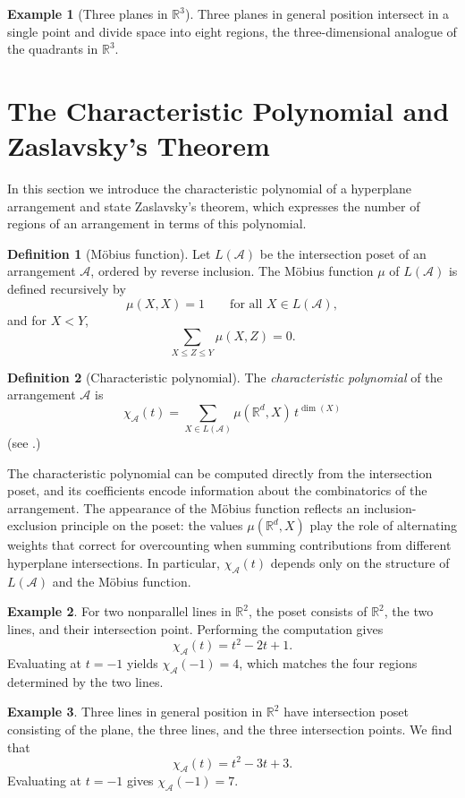 \documentclass[12pt]{amsart}
\theoremstyle{plain}
\theoremstyle{definition}
\newtheorem{definition}{Definition}[section]
\newtheorem{example}{Example}[section]
\theoremstyle{remark}
\newcommand{\R}{\mathbb{R}}
\newcommand{\A}{\mathcal{A}}
\begin{document}
\begin{example}[Three planes in $\R^3$]
Three planes in general position intersect in a single point and divide space into eight regions, the three-dimensional analogue of the quadrants in $\R^3$.
\end{example}

\section{The Characteristic Polynomial and Zaslavsky's Theorem}
In this section we introduce the characteristic polynomial of a hyperplane arrangement and state Zaslavsky's theorem, which expresses the number of regions of an arrangement in terms of this polynomial.

\begin{definition}[M\"obius function]
Let $L(\A)$ be the intersection poset of an arrangement $\A$, ordered by reverse inclusion. The M\"obius function $\mu$ of $L(\A)$ is defined recursively by
\[
\mu(X,X)=1 \qquad\text{for all } X\in L(\A),
\]
and for $X<Y$,
\[
\sum_{X \le Z \le Y} \mu(X,Z)=0.
\]
\end{definition}

\begin{definition}[Characteristic polynomial]
The \emph{characteristic polynomial} of the arrangement $\A$ is
\[
\chi_{\A}(t)=\sum_{X\in L(\A)} \mu(\R^d,X)\, t^{\dim(X)}
\]
(see \cite{ChenWang}.)
\end{definition}

The characteristic polynomial can be computed directly from the intersection poset, and its coefficients encode information about the combinatorics of the arrangement. The appearance of the M\"obius function reflects an inclusion-exclusion principle on the poset: the values $\mu(\R^d,X)$ play the role of alternating weights that correct for overcounting when summing contributions from different hyperplane intersections. In particular, $\chi_{\A}(t)$ depends only on the structure of $L(\A)$ and the M\"obius function.

\begin{example}
For two nonparallel lines in $\R^2$, the poset consists of $\R^2$, the two lines, and their intersection point. Performing the computation gives
\[
\chi_{\A}(t)=t^2-2t+1.
\]
Evaluating at $t=-1$ yields $\chi_{\A}(-1)=4$, which matches the four regions determined by the two lines.
\end{example}

\begin{example}
Three lines in general position in $\R^2$ have intersection poset consisting of the plane, the three lines, and the three intersection points. We find that
\[
\chi_{\A}(t)=t^2-3t+3.
\]
Evaluating at $t=-1$ gives $\chi_{\A}(-1)=7$.
\end{example}
\end{document}
